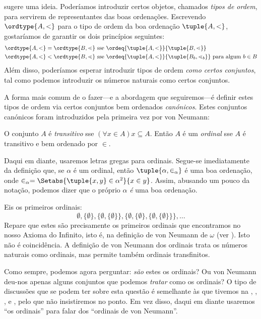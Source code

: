 \documentclass[../../../include/open-logic-section]{subfiles}
\begin{document}

 sugere uma ideia.
Poderíamos introduzir certos objetos, chamados \emph{tipos de ordem},
para servirem de representantes das boas ordenações. Escrevendo
$\ordtype{A, <}$ para o tipo de ordem da boa ordenação $\tuple{A, <}$,
gostaríamos de garantir os dois princípios seguintes:
\begin{align*}
	\ordtype{A, <} = \ordtype{B, \lessdot} & 
	\text{ sse } \ordeq{\tuple{A, <}}{\tuple{B, \lessdot}}\\
	\ordtype{A, <} < \ordtype{B, \lessdot}&
	\text{ sse }\ordeq{\tuple{A, <}}{\tuple{B_b, \lessdot_b}}\text{ para algum }b \in B
\end{align*}
Além disso, poderíamos esperar introduzir tipos de ordem \emph{como
certos conjuntos}, tal como podemos introduzir os números naturais como
certos conjuntos.

A forma mais comum de o fazer---e a abordagem que seguiremos---é definir
estes tipos de ordem via certos conjuntos bem ordenados
\emph{canónicos}. Estes conjuntos canónicos foram introduzidos pela
primeira vez por von Neumann:

\begin{defn}
O conjunto $A$ é \emph{transitivo} {sse} $(\forall x \in A)x \subseteq
A$. Então $A$ é um \emph{ordinal} {sse} $A$ é transitivo e bem ordenado
por $\in$.
\end{defn}
\noindent
Daqui em diante, usaremos letras gregas para ordinais. Segue-se
imediatamente da definição que, se $\alpha$ é um ordinal, então
$\tuple{\alpha, \in_\alpha}$ é uma boa ordenação, onde $\in_\alpha =
\Setabs{\tuple{x, y} \in \alpha^2}{x \in y}$. Assim, abusando um pouco da
notação, podemos dizer que o próprio $\alpha$ \emph{é} uma boa ordenação.

Eis os primeiros ordinais:
\[
	\emptyset, \{\emptyset\}, 
	\{\emptyset, \{\emptyset\}\}, 
	\{\emptyset, \{\emptyset\}, \{\emptyset, \{\emptyset\}\}\}, \ldots
\]
Repare que estes são precisamente os primeiros ordinais que
encontramos no nosso Axioma do Infinito, isto é, na definição de von
Neumann de $\omega$ (ver ). Isto não é
coincidência. A definição de von Neumann dos ordinais trata os números
naturais como ordinais, mas permite também ordinais transfinitos.

Como sempre, podemos agora perguntar: \emph{são} estes os ordinais? Ou
von Neumann deu-nos apenas alguns conjuntos que podemos \emph{tratar}
como os ordinais? O tipo de discussões que se podem ter sobre esta
questão é semelhante às que tivemos na ,
,
, e
, pelo que não insistiremos no ponto.
Em vez disso, daqui em diante usaremos ``os ordinais'' para falar dos
``ordinais de von Neumann''.
\end{document}
